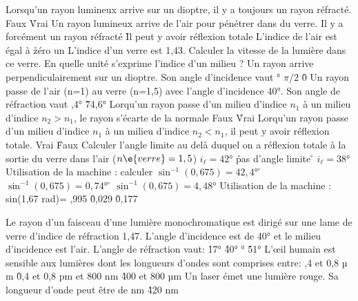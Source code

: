 \q
Lorsqu'un rayon lumineux arrive sur un dioptre, il y a toujours un rayon réfracté.
\rv
Faux
\r
Vrai
\q
Un rayon lumineux arrive de l'air pour pénétrer dans du verre.
\rv
Il y a forcément un rayon réfracté
\r
Il peut y avoir réflexion totale
\q
L'indice de l'air est égal à
\r 
zéro
\rv
un
\q
L'indice d'un verre est 1,43. Calculer la vitesse de la lumière dans ce verre.
\q
En quelle unité s'exprime l'indice d'un milieu ?
\q
Un rayon arrive perpendiculairement sur un dioptre. Son angle d'incidence vaut
°
\rv
$\pi/2$
\r
0
\q
Un rayon passe de l'air (n=1) au verre (n=1,5) avec l'angle d'incidence 40°. Son angle de réfraction vaut
,4°
\r
74,6°
\q
Lorqu'un rayon passe d'un milieu d'indice $n_1$ à un milieu d'indice $n_2>n_1$, le rayon s'écarte de la normale
\rv
Faux
\r
Vrai
\q
Lorqu'un rayon passe d'un milieu d'indice $n_1$ à un milieu d'indice $n_2<n_1$, il peut y avoir réflexion totale.
\rv
Vrai
\r
Faux
\q 
Calculer l'angle limite au delà duquel on a réflexion totale à la sortie du verre dans l'air ($n\e{verre}=1,5$)
\rv
$i_\ell=42$°
\r
pas d'angle limite
\r
$i_\ell=38°$
\q 
Utilisation de la machine : calculer
\rv
$\sin^{-1} (0,675)=42,4$°
\r 
$\sin^{-1} (0,675)=0,74$°
\r 
$\sin^{-1} (0,675)=4,48$°
\q 
Utilisation de la machine : sin(1,67 rad)=
,995
\r 
0,029
\r 
0,177

                  

 
                  


	\q
  Le rayon d'un faisceau d'une lumière monochromatique est dirigé sur une lame de verre d'indice de réfraction 1,47. L'angle d'incidence est de 40° et le milieu d'incidence est l'air. L'angle de réfraction vaut:
	\r
         17°
	\r
         40°
	°
	\r
         51°
	\q
  L'\oe il humain est sensible aux lumières dont les longueurs d'ondes sont comprises entre:
	       ,4 et 0,8 $µ$m
	 \r
         0,4 et 0,8 pm
	  et 800 nm
	 \r
         400 et 800 $µ$m
\q
Un laser émet une lumière rouge. Sa longueur d'onde peut être de 
 nm
\r
420 nm
